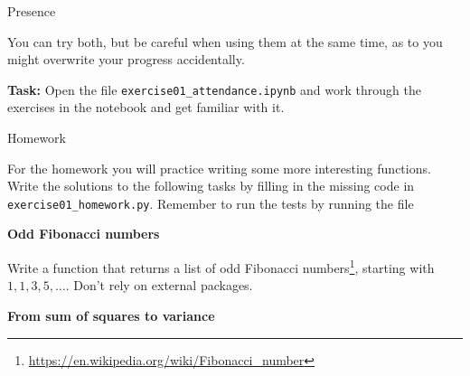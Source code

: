 \documentclass[a4paper, draft=False]{scrartcl}
\begin{document}
\begin{exam}[Presence]{Presence}
\begin{instructions}
\begin{problem*}
          You can try both, but be careful when using them at the same time, as to
          you might overwrite your progress accidentally.

          \textbf{Task:} Open the file \texttt{exercise01\_attendance.ipynb} and
          work through the exercises in the notebook and get familiar with it.
        \end{problem*}
      \end{instructions}
    \end{exam}

    \newpage
    \begin{exam}[Homework]{Homework}

      \begin{instructions}

        For the homework you will practice writing some more interesting functions.
        Write the solutions to the following tasks by filling in the missing code in
        \texttt{exercise01\_homework.py}. Remember to run the tests by running the file
      \end{instructions}

      \begin{problem}[4]\textbf{Odd Fibonacci numbers}

        Write a function  that returns a
        list of  odd Fibonacci
        numbers\footnote{\url{https://en.wikipedia.org/wiki/Fibonacci_number}},
        starting with $1, 1, 3, 5, \ldots$. Don't rely on external packages.
      \end{problem}
      \begin{problem*}[\auto]\textbf{From sum of squares to variance}


\end{problem*}
\end{exam}
\end{document}
